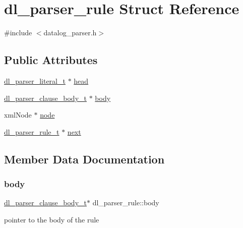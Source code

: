 \hypertarget{structdl__parser__rule}{}\section{dl\+\_\+parser\+\_\+rule Struct Reference}
\label{structdl__parser__rule}


{\ttfamily \#include $<$datalog\+\_\+parser.\+h$>$}

\subsection*{Public Attributes}
\begin{DoxyCompactItemize}
\item 
\hyperlink{datalog__parser_8h_adaef2eede58b9f7698925f7194af1373}{dl\+\_\+parser\+\_\+literal\+\_\+t} $\ast$ \hyperlink{structdl__parser__rule_a5db876663753e120f3e9317bd50846f8}{head}
\item 
\hyperlink{datalog__parser_8h_a2703a04ed12cb47b11a83f37badc09b5}{dl\+\_\+parser\+\_\+clause\+\_\+body\+\_\+t} $\ast$ \hyperlink{structdl__parser__rule_aa1f942f462503bb108d1af4da3f6f51d}{body}
\item 
xml\+Node $\ast$ \hyperlink{structdl__parser__rule_ab1344f0e0e232256a9de89baaf709466}{node}
\item 
\hyperlink{datalog__parser_8h_a8024697b9e41c6c143acefaaf5d047cd}{dl\+\_\+parser\+\_\+rule\+\_\+t} $\ast$ \hyperlink{structdl__parser__rule_a8cd9d240d0c0376f0613b84266b64eac}{next}
\end{DoxyCompactItemize}


\subsection{Member Data Documentation}
\mbox{\label{structdl__parser__rule_aa1f942f462503bb108d1af4da3f6f51d}} 
\subsubsection{\texorpdfstring{body}{body}}
{\footnotesize\ttfamily \hyperlink{datalog__parser_8h_a2703a04ed12cb47b11a83f37badc09b5}{dl\+\_\+parser\+\_\+clause\+\_\+body\+\_\+t}$\ast$ dl\+\_\+parser\+\_\+rule\+::body}

pointer to the body of the rule \mbox{\label{structdl__parser__rule_a5db876663753e120f3e9317bd50846f8}} 

